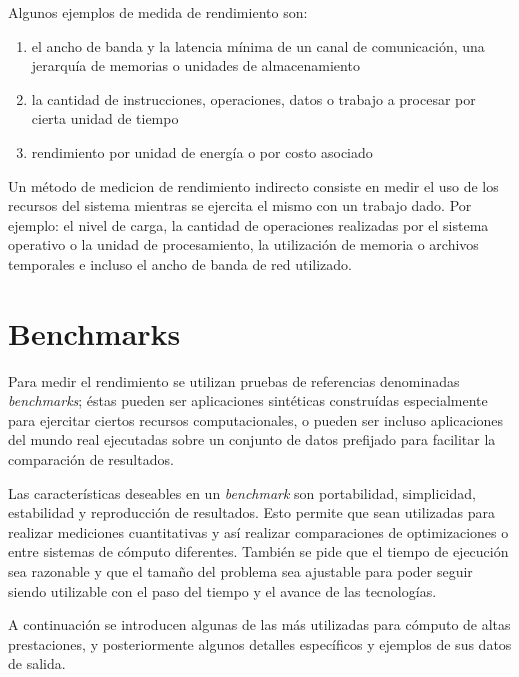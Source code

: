 \documentclass[a4paper]{report}
\begin{document}
Algunos ejemplos de medida de rendimiento son:

\begin{enumerate}
\item el ancho de banda y la latencia m\'inima de un canal de comunicaci\'on,
  una jerarqu\'ia de memorias o unidades   de almacenamiento
\item la cantidad de instrucciones, operaciones, datos o trabajo a procesar
  por cierta unidad de tiempo
\item rendimiento por unidad de energ\'ia o por costo asociado
\end{enumerate}

Un m\'etodo de medicion de rendimiento indirecto consiste en medir el uso de
los recursos del sistema mientras se ejercita el mismo con un trabajo dado.
Por ejemplo: el nivel de carga, la cantidad de operaciones realizadas por el
sistema operativo o la unidad de procesamiento, la utilizaci\'on de memoria o
archivos temporales e incluso el ancho de banda de red utilizado.

\section{Benchmarks}

Para medir el rendimiento se utilizan pruebas de referencias denominadas
{\em benchmarks}; \'estas pueden ser aplicaciones sint\'eticas constru\'idas
especialmente para ejercitar ciertos recursos computacionales, o pueden ser incluso
aplicaciones del mundo real ejecutadas sobre un conjunto de datos prefijado para
facilitar la comparaci\'on de resultados.

\bigskip

Las caracter\'isticas deseables en un {\it benchmark} son portabilidad, simplicidad, estabilidad y
reproducci\'on de resultados. Esto permite que sean utilizadas para realizar
mediciones cuantitativas y as\'i realizar comparaciones de optimizaciones o
entre sistemas de c\'omputo diferentes. Tambi\'en se pide que el tiempo de
ejecuci\'on sea razonable y que el tama\~no del problema sea ajustable para
poder seguir siendo utilizable con el paso del tiempo y el avance de las
tecnolog\'ias.

\bigskip

A continuaci\'on se introducen algunas de las m\'as utilizadas para c\'omputo
de altas prestaciones, y posteriormente algunos detalles espec\'ificos y ejemplos de sus datos de salida.
\end{document}
